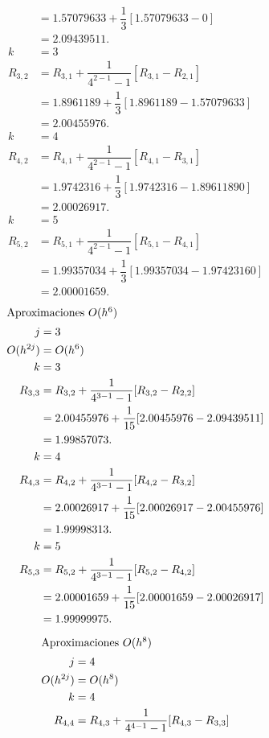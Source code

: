 \begin{exerciseT}
\begin{align*}
			&= 1.57079633 + \dfrac{1}{3}[1.57079633-0]\\
			&= 2.09439511.\\
		k &= 3\\
		R_{3,2} &= R_{3,1} + \dfrac{1}{4^{2-1}-1}[R_{3,1}-R_{2,1}]\\
			&= 1.8961189 + \dfrac{1}{3}[1.8961189-1.57079633]\\
			&= 2.00455976.\\
		k &= 4\\
		R_{4,2} &= R_{4,1} + \dfrac{1}{4^{2-1}-1}[R_{4,1}-R_{3,1}]\\
			&= 1.9742316 + \dfrac{1}{3}[1.9742316-1.89611890]\\
			&= 2.00026917.\\
		k &= 5\\
		R_{5,2} &= R_{5,1} + \dfrac{1}{4^{2-1}-1}[R_{5,1}-R_{4,1}]\\
			&= 1.99357034 + \dfrac{1}{3}[1.99357034-1.97423160]\\
			&= 2.00001659.
	\end{align*}
	\begin{align*}
		\intertext{Aproximaciones $O(h^6)$}
		j &= 3\\
		O(h^{2j}) &= O(h^6)\\
		k &= 3\\
		R_{3,3} &= R_{3,2} + \dfrac{1}{4^{3-1}-1}[R_{3,2}-R_{2,2}]\\
			&= 2.00455976 + \dfrac{1}{15}[2.00455976-2.09439511]\\
			&= 1.99857073.\\
		k &= 4\\
		R_{4,3} &= R_{4,2} + \dfrac{1}{4^{3-1}-1}[R_{4,2}-R_{3,2}]\\
			&= 2.00026917 + \dfrac{1}{15}[2.00026917-2.00455976]\\
			&= 1.99998313.\\
		k &= 5\\
		R_{5,3} &= R_{5,2} + \dfrac{1}{4^{3-1}-1}[R_{5,2}-R_{4,2}]\\
			&= 2.00001659 + \dfrac{1}{15}[2.00001659-2.00026917]\\
			&= 1.99999975.
	\end{align*}
	\begin{align*}
		\intertext{Aproximaciones $O(h^8)$}
		j &= 4\\
		O(h^{2j}) &= O(h^8)\\
		k &= 4\\
		R_{4,4} &= R_{4,3} + \dfrac{1}{4^{4-1}-1}[R_{4,3}-R_{3,3}]\\

\end{align*}
\end{exerciseT}
